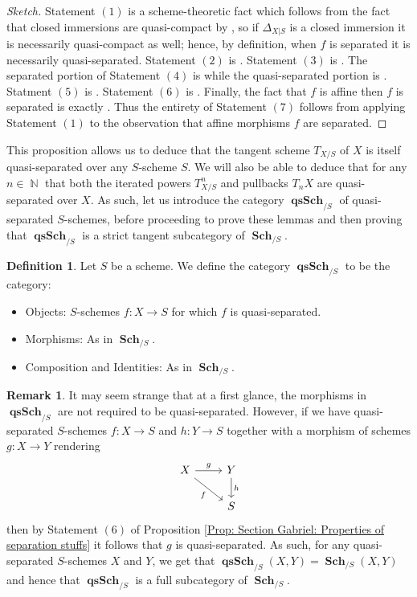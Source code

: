 \documentclass{amsart}
\theoremstyle{definition}
\newtheorem{remark}[equation]{Remark}
\newtheorem{definition}[equation]{Definition}
\DeclareMathOperator{\qsSch}{\mathbf{qsSch}}
\DeclareMathOperator{\N}{\mathbb{N}}
\DeclareMathOperator{\Sch}{\mathbf{Sch}}
\numberwithin{equation}{subsection}
\begin{document}
\begin{proof}[Sketch]
Statement $(1)$ is a scheme-theoretic fact which follows from the fact that closed immersions are quasi-compact by \cite[Proposition 1.1.2.i]{EGA41}, so if $\Delta_{X|S}$ is a closed immersion it is necessarily quasi-compact as well; hence, by definition, when $f$ is separated it is necessarily quasi-separated. Statement $(2)$ is \cite[Proposition 5.5.1.ii]{EGA1}. Statement $(3)$ is \cite[Proposition I.2.2.ii]{EGA41}. The separated portion of Statement $(4)$ is \cite[Corollaire 5.5.3]{EGA1} while the quasi-separated portion is \cite[Proposition I.2.2iii]{EGA41}. Statment $(5)$ is \cite[Proposition 5.5.1.v]{EGA1}. Statement $(6)$ is \cite[Proposition I.2.2.v]{EGA41}. Finally, the fact that $f$ is affine then $f$ is separated is exactly \cite[Proposition I.2.4]{EGA2}. Thus the entirety of Statement $(7)$ follows from applying Statement $(1)$ to the observation that affine morphisms $f$ are separated.
\end{proof}

This proposition allows us to deduce that the tangent scheme $T_{X/S}$ of $X$ is itself quasi-separated over any $S$-scheme $S$. We will also be able to deduce that for any $n \in \N$ that both the iterated powers $T^n_{X/S}$ and pullbacks $T_{n}X$ are quasi-separated over $X$. As such, let us introduce the category $\qsSch_{/S}$ of quasi-separated $S$-schemes, before proceeding to prove these lemmas and then proving that $\qsSch_{/S}$ is a strict tangent subcategory of $\Sch_{/S}$.

\begin{definition}\label{Defn: Cat of qs schemes}
Let $S$ be a scheme. We define the category $\qsSch_{/S}$ to be the category:
\begin{itemize}
	\item Objects: $S$-schemes $f:X \to S$ for which $f$ is quasi-separated.
	\item Morphisms: As in $\Sch_{/S}$.
	\item Composition and Identities: As in $\Sch_{/S}$.
\end{itemize}
\end{definition}
\begin{remark}\label{Remark: Section Gabriel: All maps in qsSch are qs}
It may seem strange that at a first glance, the morphisms in $\qsSch_{/S}$ are not required to be quasi-separated. However, if we have quasi-separated $S$-schemes $f:X \to S$ and $h:Y \to S$ together with a morphism of schemes $g:X \to Y$ rendering
\[
\begin{tikzcd}
X \ar[dr, swap]{}{f} \ar[r]{}{g} & Y \ar[d]{}{h} \\
 & S
\end{tikzcd}
\]
then by Statement $(6)$ of Proposition \ref{Prop: Section Gabriel: Properties of separation stuffs} it follows that $g$ is quasi-separated. As such, for any quasi-separated $S$-schemes $X$ and $Y$, we get that $\qsSch_{/S}(X,Y) = \Sch_{/S}(X,Y)$ and hence that $\qsSch_{/S}$ is a full subcategory of $\Sch_{/S}$.
\end{remark}
\end{document}
